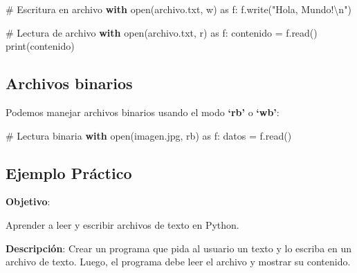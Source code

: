 \documentclass[
  a4paper,
  DIV=11,
  numbers=noendperiod,
  onepage,
  openany]{scrreprt}
\newenvironment{Shaded}{\begin{snugshade}}{\end{snugshade}}
\newcommand{\BuiltInTok}[1]{\textcolor[rgb]{0.00,0.23,0.31}{#1}}
\newcommand{\CharTok}[1]{\textcolor[rgb]{0.13,0.47,0.30}{#1}}
\newcommand{\CommentTok}[1]{\textcolor[rgb]{0.37,0.37,0.37}{#1}}
\newcommand{\ControlFlowTok}[1]{\textcolor[rgb]{0.00,0.23,0.31}{\textbf{#1}}}
\newcommand{\ImportTok}[1]{\textcolor[rgb]{0.00,0.46,0.62}{#1}}
\newcommand{\NormalTok}[1]{\textcolor[rgb]{0.00,0.23,0.31}{#1}}
\newcommand{\OperatorTok}[1]{\textcolor[rgb]{0.37,0.37,0.37}{#1}}
\newcommand{\StringTok}[1]{\textcolor[rgb]{0.13,0.47,0.30}{#1}}
\begin{document}
\begin{Shaded}
\begin{Highlighting}[]
\CommentTok{\# Escritura en archivo}
\ControlFlowTok{with} \BuiltInTok{open}\NormalTok{(}\StringTok{\textquotesingle{}archivo.txt\textquotesingle{}}\NormalTok{, }\StringTok{\textquotesingle{}w\textquotesingle{}}\NormalTok{) }\ImportTok{as}\NormalTok{ f:}
\NormalTok{    f.write(}\StringTok{"Hola, Mundo!}\CharTok{\textbackslash{}n}\StringTok{"}\NormalTok{)}

\CommentTok{\# Lectura de archivo}
\ControlFlowTok{with} \BuiltInTok{open}\NormalTok{(}\StringTok{\textquotesingle{}archivo.txt\textquotesingle{}}\NormalTok{, }\StringTok{\textquotesingle{}r\textquotesingle{}}\NormalTok{) }\ImportTok{as}\NormalTok{ f:}
\NormalTok{    contenido }\OperatorTok{=}\NormalTok{ f.read()}
    \BuiltInTok{print}\NormalTok{(contenido)}
\end{Highlighting}
\end{Shaded}

\subsection{Archivos binarios}\label{archivos-binarios}

Podemos manejar archivos binarios usando el modo \textbf{`rb'} o
\textbf{`wb'}:

\begin{Shaded}
\begin{Highlighting}[]
\CommentTok{\# Lectura binaria}
\ControlFlowTok{with} \BuiltInTok{open}\NormalTok{(}\StringTok{\textquotesingle{}imagen.jpg\textquotesingle{}}\NormalTok{, }\StringTok{\textquotesingle{}rb\textquotesingle{}}\NormalTok{) }\ImportTok{as}\NormalTok{ f:}
\NormalTok{    datos }\OperatorTok{=}\NormalTok{ f.read()}
\end{Highlighting}
\end{Shaded}

\subsection{Ejemplo Práctico}\label{ejemplo-pruxe1ctico-2}

\textbf{Objetivo}:

Aprender a leer y escribir archivos de texto en Python.

\textbf{Descripción}: Crear un programa que pida al usuario un texto y
lo escriba en un archivo de texto. Luego, el programa debe leer el
archivo y mostrar su contenido.
\end{document}
